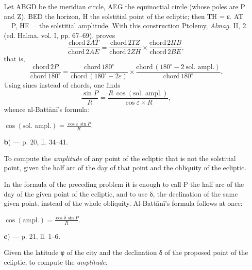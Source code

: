\documentclass[11pt]{article}
\newcommand{\Pg}[1]{\marginpar{\footnotesize\color{gray}#1}}
\begin{document}
\par \Pg{I 178}Let ABGD be the meridian circle, AEG the equinoctial circle (whose poles are P and Z), BED the horizon, H the solstitial point of the ecliptic; then TH = {\greekfont ε}, AT = P, HE = the solstitial amplitude. With this construction Ptolemy, \emph{Almag.} II, 2 (ed. Halma, vol. I, pp. 67–69), proves \[ \frac{\text{chord}\,2AT}{\text{chord}\,2AE} = \frac{\text{chord}\,2TZ}{\text{chord}\,2ZH} \times \frac{\text{chord}\,2HB}{\text{chord}\,2BE}, \] that is, \[ \frac{\text{chord}\,2P}{\text{chord}\,180^\circ} = \frac{\text{chord}\,180^\circ}{\text{chord}\,(180^\circ - 2\varepsilon)} \times \frac{\text{chord}\,(180^\circ - 2\ \text{sol. ampl.})}{\text{chord}\,180^\circ}. \] Using sines instead of chords, one finds \[ \frac{\sin P}{R} = \frac{R\,\cos(\text{sol. ampl.})}{\cos\varepsilon \times R}, \] whence al-Battānī's formula: \par\noindent\hspace*{1.5em}$\displaystyle \cos(\text{sol. ampl.}) = \frac{\cos\varepsilon\,\sin P}{R}.$\par\par
\par\begin{center}\textbf{b}) — p. 20, ll. 34–41.\end{center}
\par To compute the \emph{amplitude} of any point of the ecliptic that is not the solstitial point, given the half arc of the day of that point and the obliquity of the ecliptic.\par
\par In the formula of the preceding problem it is enough to call P the half arc of the day of the given point of the ecliptic, and to use {\greekfont δ}, the declination of the same given point, instead of the whole obliquity. Al-Battānī's formula follows at once: \par\noindent\hspace*{1.5em}$\displaystyle \cos(\text{ampl.}) = \frac{\cos\delta\,\sin P}{R}.$\par\par
\par\begin{center}\textbf{c}) — p. 21, ll. 1–6.\end{center}
\par Given the latitude {\greekfont φ} of the city and the declination {\greekfont δ} of the proposed point of the ecliptic, to compute the \emph{amplitude}.\par
\end{document}
